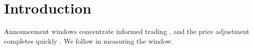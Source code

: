 \section{Introduction}
Announcement windows concentrate informed trading \citep{bernile2016}, and
the price adjustment completes quickly \citep{ederington1993}.
We follow \citet{ederington1993} in measuring the window.
